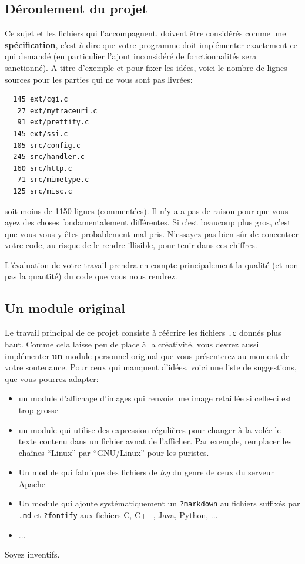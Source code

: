 \documentclass[10pt,a4paper]{article}
\begin{document}
\subsection*{Déroulement du projet}

Ce sujet et les fichiers qui l'accompagnent, doivent être considérés
comme une {\bf spécification}, c'est-à-dire que votre programme doit
implémenter exactement ce qui demandé (en particulier l'ajout
inconsidéré de fonctionnalités sera sanctionné). A titre d'exemple et
pour fixer les idées, voici le nombre de lignes sources pour les
parties qui ne vous sont pas livrées:

\begin{verbatim}
  145 ext/cgi.c
   27 ext/mytraceuri.c
   91 ext/prettify.c
  145 ext/ssi.c
  105 src/config.c
  245 src/handler.c
  160 src/http.c
   71 src/mimetype.c
  125 src/misc.c
\end{verbatim}
soit moins de 1150 lignes (commentées). Il n'y a a pas de raison pour
que vous ayez des choses fondamentalement différentes. Si c'est
beaucoup plus gros, c'est que vous vous y êtes probablement mal
pris. N'essayez pas bien sûr de concentrer votre code, au risque de le
rendre illisible, pour tenir dans ces chiffres.

L'évaluation de votre travail prendra en compte principalement la
qualité (et non pas la quantité) du code que vous nous rendrez.

\subsection*{Un module original}

Le travail principal de ce projet consiste à réécrire les fichiers
\texttt{.c} donnés plus haut. Comme cela laisse peu de place à la
créativité, vous devrez aussi implémenter \textbf{un} module personnel
original que vous présenterez au moment de votre soutenance. Pour ceux
qui manquent d'idées, voici une liste de suggestions, que vous pourrez
adapter:
\begin{itemize}
\item un module d'affichage d'images qui renvoie une image retaillée
  si celle-ci est trop grosse
\item un module qui utilise des expression régulières pour changer à la volée le
  texte contenu dans un fichier avnat de l'afficher. Par exemple, remplacer les chaînes
  ``Linux'' par ``GNU/Linux'' pour les puristes.
\item Un module qui fabrique des fichiers de \emph{log} du genre de
  ceux du serveur
  \href{http://en.wikipedia.org/wiki/Common_Log_Format}{Apache}
\item Un module qui ajoute systématiquement un \texttt{?markdown} au
  fichiers suffixés par \texttt{.md} et \texttt{?fontify} aux fichiers
  C, C++, Java, Python, ...
\item ...
\end{itemize}

Soyez inventifs.
\end{document}

